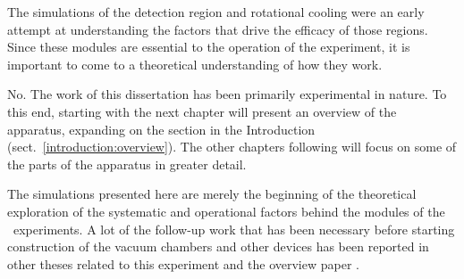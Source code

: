 The simulations of the detection region and rotational cooling were an early
attempt at understanding the factors that drive the efficacy of those regions.
Since these modules are essential to the operation of the experiment, it is
important to come to a theoretical understanding of how they work.


No. The work of this dissertation has been primarily experimental in nature. To
this end, starting with the next chapter will present an overview of the
apparatus, expanding on the section in the Introduction
(sect.~\ref{introduction:overview}). The other chapters following will focus on
some of the parts of the apparatus in greater detail.


The simulations presented here are merely the beginning of the theoretical
exploration of the systematic and operational factors behind the modules of the
\CENTREX\ experiments. A lot of the follow-up work that has been necessary
before starting construction of the vacuum chambers and other devices has been
reported in other theses related to this experiment \cite{timgren2023thesis} and
the overview paper \cite{grasdijk2021centrex}.
